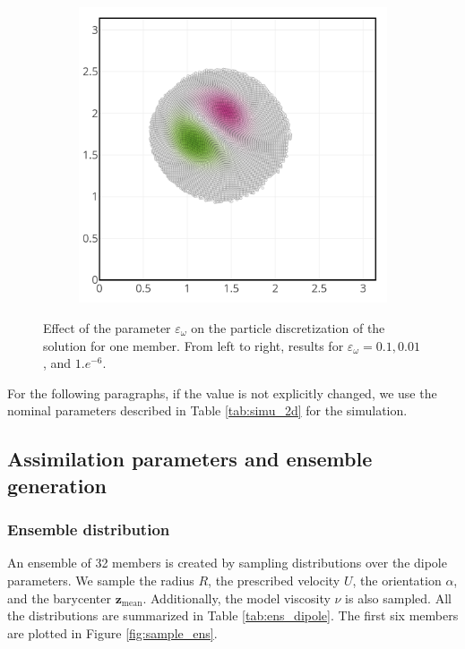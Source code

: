 \begin{figure}[htbp]
\begin{subfigure}{0.3\textwidth}
	\end{subfigure}
	\hfill
	\begin{subfigure}{0.3\textwidth}
		\includegraphics[width=\linewidth]{images/app2d/part_eps_1e-6.png}
	\end{subfigure}
	\caption{Effect of the parameter $\varepsilon_\omega$ on the particle discretization of the solution for one member. From left to right, results for $\varepsilon_\omega = 0.1, 0.01$, and $1.e^{-6}$.}
	\label{fig:eps_effect}
\end{figure}

For the following paragraphs, if the value is not explicitly changed, we use the nominal parameters described in Table \ref{tab:simu_2d} for the simulation.

\subsection{Assimilation parameters and ensemble generation}

\subsubsection{Ensemble distribution}
An ensemble of 32 members is created by sampling distributions over the dipole parameters. We sample the radius $R$, the prescribed velocity $U$, the orientation $\alpha$, and the barycenter $\bm z_{\text{mean}}$. Additionally, the model viscosity $\nu$ is also sampled. All the distributions are summarized in Table \ref{tab:ens_dipole}. The first six members are plotted in Figure \ref{fig:sample_ens}.

